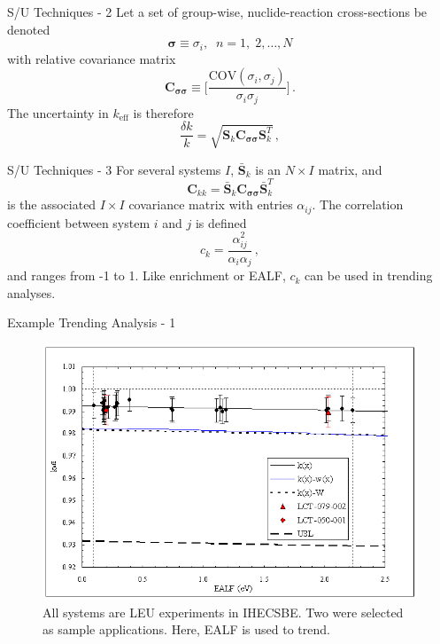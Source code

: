 \documentclass[10pt]{beamer}
\newcommand{\keff}{$k_{\text{eff}}$ }
\begin{document}
\begin{frame}{S/U Techniques - 2}
Let a set of group-wise, nuclide-reaction cross-sections be denoted 
\begin{equation}
 \bm{\sigma} \equiv \sigma_i, \; \; n = 1,\;2,\ldots,N
\end{equation}
with relative covariance matrix
\begin{equation}
 \mathbf{C_{\sigma \sigma}} \equiv 
   \Bigg[\frac{\mathrm{COV}(\sigma_i,\sigma_j)} {\sigma_i \sigma_j} \Bigg ] \, .
\end{equation}
The uncertainty in \keff is therefore
\begin{equation}
\frac{\delta k}{k} = \sqrt{ \mathbf{S}_k \mathbf{C_{\sigma \sigma}} 
                     \mathbf{S}_k^T } \, ,
\end{equation}

\end{frame}

\begin{frame}{S/U Techniques - 3}
For several systems $I$, $\mathbf{\bar{S}}_k$ is an $N \times I$ matrix,
and
\begin{equation}
 \mathbf{C}_{kk} =  \mathbf{\bar{S}}_k \mathbf{C_{\sigma \sigma}} 
                    \mathbf{\bar{S}}_k^T  
\end{equation}
is the associated $I\times I$ covariance matrix with entries $\alpha_{ij}$.
\vfill
The correlation coefficient between system $i$ and $j$ is defined
\begin{equation}
 c_{k} =  \frac{\alpha^2_{ij}}{\alpha_i \alpha_j}  \, ,
\end{equation}
and ranges from -1 to 1.  Like enrichment or EALF, $c_k$ can be
used in trending analyses.
\end{frame}

\begin{frame}[fragile]{Example Trending Analysis - 1}
  \begin{figure}
    \includegraphics[keepaspectratio, width = 3.2 in]{images/trend_ealf}
    \caption{All systems are LEU experiments in IHECSBE.  Two were selected
             as sample applications.  Here, EALF is used to trend.}
  \end{figure}
\end{frame}
\end{document}
